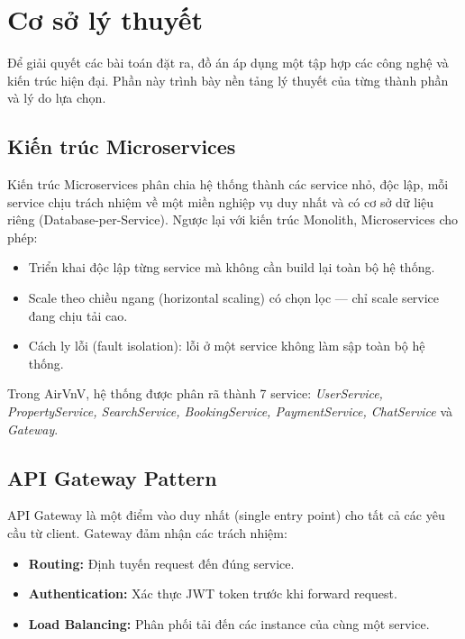 \section{Cơ sở lý thuyết}
\label{sec:co_so_ly_thuyet}

Để giải quyết các bài toán đặt ra, đồ án áp dụng một tập hợp các công nghệ và kiến trúc hiện đại.
Phần này trình bày nền tảng lý thuyết của từng thành phần và lý do lựa chọn.

\subsection{Kiến trúc Microservices}
\label{subsec:microservices}

Kiến trúc Microservices phân chia hệ thống thành các service nhỏ, độc lập, mỗi service chịu
trách nhiệm về một miền nghiệp vụ duy nhất và có cơ sở dữ liệu riêng (Database-per-Service).
Ngược lại với kiến trúc Monolith, Microservices cho phép:

\begin{itemize}
    \item Triển khai độc lập từng service mà không cần build lại toàn bộ hệ thống.
    \item Scale theo chiều ngang (horizontal scaling) có chọn lọc — chỉ scale service đang chịu tải cao.
    \item Cách ly lỗi (fault isolation): lỗi ở một service không làm sập toàn bộ hệ thống.
\end{itemize}

Trong AirVnV, hệ thống được phân rã thành 7 service: \textit{UserService, PropertyService,
SearchService, BookingService, PaymentService, ChatService} và \textit{Gateway}.

\subsection{API Gateway Pattern}
\label{subsec:api_gateway}

API Gateway là một điểm vào duy nhất (single entry point) cho tất cả các yêu cầu từ client.
Gateway đảm nhận các trách nhiệm:

\begin{itemize}
    \item \textbf{Routing:} Định tuyến request đến đúng service.
    \item \textbf{Authentication:} Xác thực JWT token trước khi forward request.
    \item \textbf{Load Balancing:} Phân phối tải đến các instance của cùng một service.
\end{itemize}

